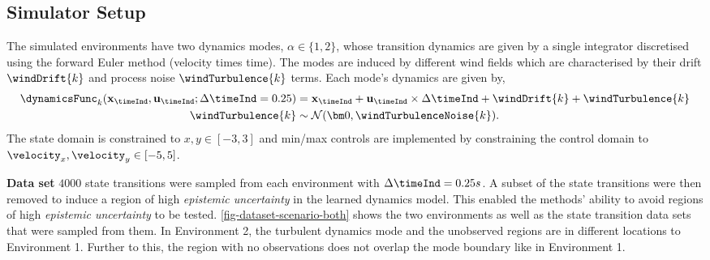 \documentclass{mimosis-class/mimosis}
\numberwithin{equation}{chapter}
\newcommand{\modeInd}{\ensuremath{k}}
\newcommand{\mode}[1]{\ensuremath{#1_{\modeInd}}}
\newcommand{\state}{\ensuremath{\mathbf{x}}}
\newcommand{\control}{\ensuremath{\mathbf{u}}}
\newcommand{\modeVar}{\ensuremath{\alpha}}
\begin{document}
{\subsection{Simulator Setup}
\label{sec:org471c643}
The simulated environments have two dynamics modes, \(\modeVar \in \{1, 2\}\), whose
transition dynamics are given by a single integrator discretised using the forward Euler method
(velocity times time).
The modes are induced by different wind fields which are characterised by their
drift \(\windDrift{\modeInd}\) and process noise \(\windTurbulence{\modeInd}\) terms.
Each mode's dynamics are given by,
\begin{align}
\mode{\dynamicsFunc}(\state_\timeInd, \control_\timeInd; \Delta\timeInd=0.25)
&= \state_{\timeInd} + \control_{\timeInd} \times \Delta\timeInd + \windDrift{\modeInd} + \windTurbulence{\modeInd} \\
\windTurbulence{\modeInd} &\sim \mathcal{N}(\bm0, \windTurbulenceNoise{\modeInd}).
\end{align}
The state domain is constrained to \(x, y \in [-3, 3]\) and min/max controls are implemented by constraining the
control domain to \(\velocity_x, \velocity_y \in [-5, 5]\).


\textbf{Data set} \(4000\) state transitions were sampled from each environment with \(\Delta \timeInd = 0.25s\).
A subset of the state transitions were then removed to induce a region of high \emph{epistemic uncertainty} in the
learned dynamics model.
This enabled the methods' ability to avoid regions of high \emph{epistemic uncertainty} to be tested.
\cref{fig-dataset-scenario-both} shows the two environments as well as the state transition data sets that were
sampled from them.
In Environment 2, the turbulent dynamics mode and the unobserved regions are in different locations to
Environment 1.
Further to this, the region with no observations does not overlap the mode boundary like in Environment 1.

}
\end{document}

